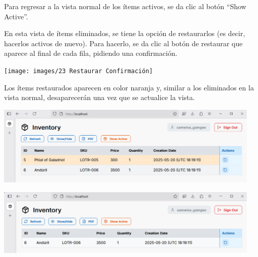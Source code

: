 Para regresar a la vista normal de los ítems activos, se da clic al botón “Show Active”.

En esta vista de ítems eliminados, se tiene la opción de restaurarlos (es decir, hacerlos activos de nuevo). Para hacerlo, se da clic al botón de restaurar que aparece al final de cada fila, pidiendo una confirmación.

\begin{center}
\texttt{[image: images/23 Restaurar Confirmación]}
\end{center}

Los ítems restaurados aparecen en color naranja y, similar a los eliminados en la vista normal, desaparecerán una vez que se actualice la vista.

\begin{center}
\includegraphics[width=0.95\textwidth]{images/24 Restaurado}
\end{center}
\begin{center}
\includegraphics[width=0.95\textwidth]{images/25 Eliminados Actualizado}
\end{center}
